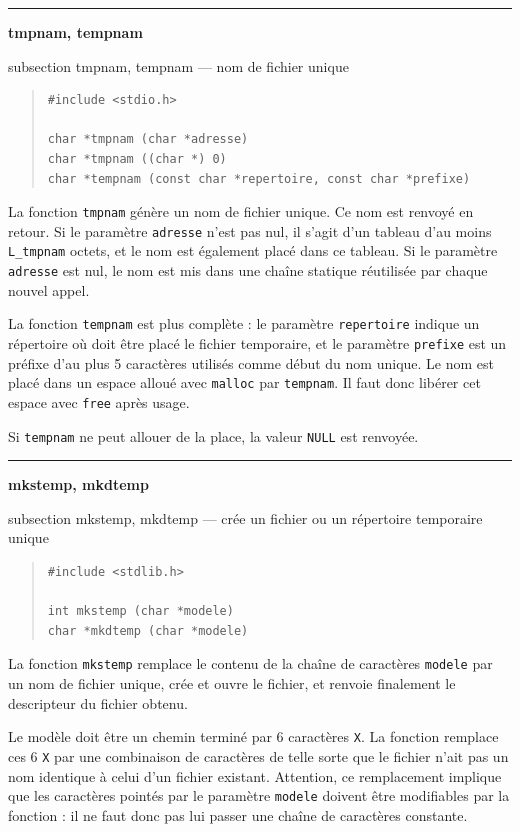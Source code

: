 \documentclass [twoside] {report}
\newcommand {\primitive} [1]
    {
	\phantomsection
	{\large \textbf {#1}}
	\addcontentsline {toc} {subsection} {#1}
    }
\newcommand {\separation}
    {
	\vspace {5mm}
	\nopagebreak
	\hrule
    }
\begin{document}
\separation 
\primitive {tmpnam, tempnam} --- nom de fichier unique

\begin {quote}
\begin {verbatim}
#include <stdio.h>

char *tmpnam (char *adresse)
char *tmpnam ((char *) 0)
char *tempnam (const char *repertoire, const char *prefixe)
\end{verbatim}
\end {quote}

La fonction \texttt {tmpnam} génère un nom de fichier unique. Ce nom est
renvoyé en retour. Si le paramètre \texttt {adresse} n'est pas nul, il s'agit
d'un tableau d'au moins \texttt {L\_tmpnam} octets, et le nom
est également placé dans ce tableau. Si le paramètre \texttt {adresse} est
nul, le nom est mis dans une chaîne statique réutilisée par chaque
nouvel appel.

La fonction \texttt {tempnam} est plus complète : le paramètre \texttt
{repertoire} indique un répertoire où doit être placé le fichier
temporaire, et le paramètre \texttt {prefixe} est un préfixe d'au plus
5 caractères utilisés comme début du nom unique. Le nom est placé
dans un espace alloué avec \texttt {malloc} par \texttt {tempnam}. Il
faut donc libérer cet espace avec \texttt {free} après usage.

Si \texttt {tempnam} ne peut allouer de la place, la valeur \texttt {NULL} est
renvoyée.



\separation 
\primitive {mkstemp, mkdtemp} --- crée un fichier ou un répertoire temporaire unique
    \label {mkstemp}

\begin {quote}
\begin {verbatim}
#include <stdlib.h>

int mkstemp (char *modele)
char *mkdtemp (char *modele)
\end{verbatim}
\end {quote}

La fonction \texttt {mkstemp} remplace le contenu de la chaîne de
caractères \texttt {modele} par un nom de fichier unique, crée et
ouvre le fichier, et renvoie finalement le descripteur du fichier obtenu.

Le modèle doit être un chemin terminé par 6 caractères \texttt{X}. La
fonction remplace ces 6 \texttt{X} par une combinaison de caractères
de telle sorte que le fichier n'ait pas un nom identique à celui d'un
fichier existant. Attention, ce remplacement implique que les caractères
pointés par le paramètre \texttt{modele} doivent être modifiables par
la fonction : il ne faut donc pas lui passer une chaîne de caractères
constante.
\end{document}
